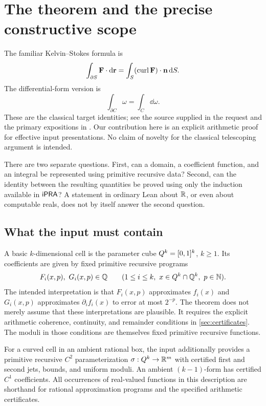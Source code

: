 \section{The theorem and the precise constructive scope}\label{sec:scope}

The familiar Kelvin--Stokes formula is
\begin{equation}\label{eq:kelvin-intro}
 \int_{\partial S}\mathbf F\cdot\mathrm d\mathbf r
 =\int_S(\operatorname{curl}\mathbf F)\cdot\mathbf n\,\mathrm d S.
\end{equation}
The differential-form version is
\begin{equation}\label{eq:stokes-intro}
 \int_{\partial C}\omega=\int_C\dd\omega.
\end{equation}
These are the classical target identities; see the source supplied in the
request and the primary expositions in \cite{dyatlov,poonen}. Our contribution
here is an explicit arithmetic proof for effective input presentations. No
claim of novelty for the classical telescoping argument is intended.

There are two separate questions. First, can a domain, a coefficient function,
and an integral be represented using primitive recursive data? Second, can the
identity between the resulting quantities be proved using only the induction
available in $\mathsf{iPRA}$? A statement in ordinary Lean about $\mathbb R$, or even about
computable reals, does not by itself answer the second question.

\subsection{What the input must contain}

A basic $k$-dimensional cell is the parameter cube $Q^k=[0,1]^{k}$, $k\ge1$.
Its coefficients are given by fixed primitive recursive programs
\[
 F_i(x,p),\ G_i(x,p)\in\Q \qquad(1\le i\le k,\ x\in Q^k\cap\Q^k,\ p\in\N).
\]
The intended interpretation is that $F_i(x,p)$ approximates $f_i(x)$ and
$G_i(x,p)$ approximates $\partial_i f_i(x)$ to error at most $2^{-p}$.
The theorem does not merely assume that these interpretations are plausible.
It requires the explicit arithmetic coherence, continuity, and remainder
conditions in \cref{sec:certificates}. The moduli in those conditions are
themselves fixed primitive recursive functions.

For a curved cell in an ambient rational box, the input additionally provides
a primitive recursive $C^2$ parameterization $\sigma:Q^k\to\mathbb R^m$ with certified
first and second jets, bounds, and uniform moduli. An ambient $(k-1)$-form
has certified $C^1$ coefficients. All occurrences of real-valued functions in
this description are shorthand for rational approximation programs and the
specified arithmetic certificates.

